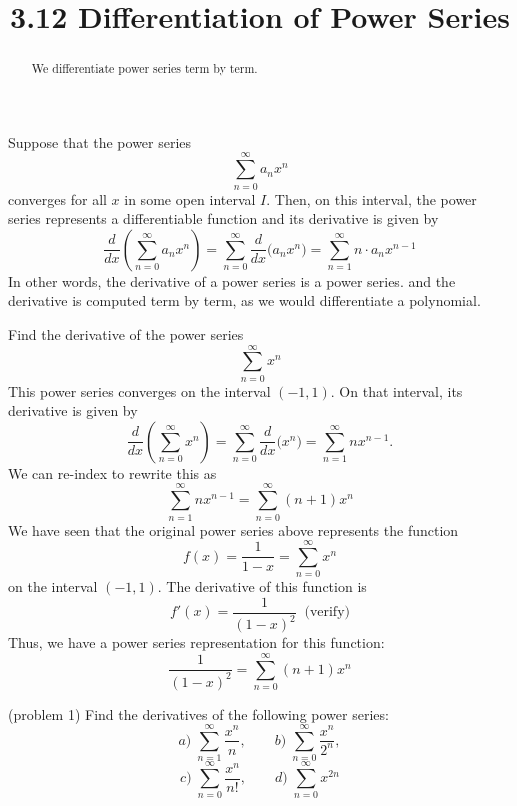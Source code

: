 \documentclass[handout]{ximera}
\title{3.12 Differentiation of Power Series}
\begin{document}
\begin{abstract}
We differentiate power series term by term.
\end{abstract}

\maketitle



Suppose that the power series 
\[
\sum_{n=0}^\infty a_n x^n
\]
converges for all $x$ in some open interval $I$. Then, on this interval, the power series represents a differentiable function and its derivative is given by 
\[
\frac{d}{dx} \left( \sum_{n=0}^\infty a_n x^n \right) = \sum_{n=0}^\infty  \frac{d}{dx}\big( a_n x^n \big)  
= \sum_{n=1}^\infty   n\cdot a_n x^{n-1}
\]
In other words, the derivative of a power series is a power series. and the derivative is computed term by term, as we would differentiate a polynomial.

\begin{example}[example 1]
Find the derivative of the power series
\[
\sum_{n=0}^\infty x^n
\]
This power series converges on the interval $(-1, 1)$.
On that interval, its derivative is given by
\[
\frac{d}{dx}\left( \sum_{n=0}^\infty x^n \right)= \sum_{n=0}^\infty \frac{d}{dx} \big(x^n\big) = \sum_{n=1}^\infty nx^{n-1}.
\]
We can re-index to rewrite this as
\[
\sum_{n=1}^\infty nx^{n-1} = \sum_{n=0}^\infty (n+1)x^n
\]
We have seen that the original power series above represents the function 
\[
f(x) = \frac{1}{1-x} = \sum_{n=0}^\infty x^n
\]
on the interval $(-1, 1)$. The derivative of this function is
\[
f'(x) = \frac{1}{(1-x)^2} \;\; \text{(verify)}
\]
Thus, we have a power series representation for this function:
\[
\frac{1}{(1-x)^2} = \sum_{n=0}^\infty (n+1)x^n
\]
\end{example}



\begin{problem}(problem 1)
Find the derivatives of the following power series:
\[
a) \; \sum_{n=1}^\infty \frac{x^n}{n},\qquad  b) \; \sum_{n=0}^\infty \frac{x^n}{2^n},
\]
\[
 c) \; \sum_{n=0}^\infty \frac{x^n}{n!},\qquad d) \; \sum_{n=0}^\infty x^{2n}
\]
\end{problem}
\end{document}
